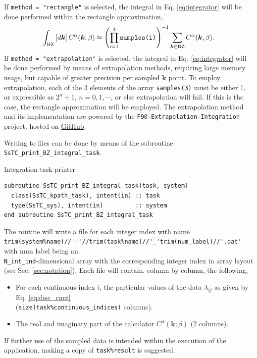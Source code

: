 \documentclass[10pt,a4paper]{article}
\begin{document}
If \verb|method = "rectangle"| is selected, the integral in Eq. \eqref{eq:integrator} will be done performed within the rectangle approximation,
\begin{equation}
\int_{\text{BZ}} \left[d\bm{k}\right]C^{\alpha}(\bm{k},\beta) \approx \left(\prod_{i=1}^3 \verb|samples(i)|\right)^{-1}\sum_{\bm{k}\in\text{BZ}} C^{\alpha}(\bm{k},\beta).
\end{equation}
If \verb|method = "extrapolation"| is selected, the integral in Eq. \eqref{eq:integrator} will be done performed by means of extrapolation methods, requiring large memory usage, but capable of greater precision per sampled $\bm{k}$ point. To employ extrapolation, each of the 3 elements of the array \verb|samples(3)| must be either 1, or expressible as $2^n + 1$, $n = 0, 1, \cdots$, or else extrapolation will fail. If this is the case, the rectangle approximation will be employed. The extrapolation method and its implementation are powered by the \verb|F90-Extrapolation-Integration| project, hosted on \href{https://github.com/irukoa/F90-Extrapolation-Integration}{GitHub}.

Writing to files can be done by means of the subroutine \verb|SsTC_print_BZ_integral_task|.
\begin{codebox}{Integration task printer}
\begin{lstlisting}[caption={Interface of the ``integrator" printer.},captionpos=b]
subroutine SsTC_print_BZ_integral_task(task, system)
  class(SsTC_kpath_task), intent(in) :: task
  type(SsTC_sys), intent(in)         :: system
end subroutine SsTC_print_BZ_integral_task
\end{lstlisting}
\end{codebox}
The routine will write a file for each integer index with name \\ \verb|trim(system%name)//'-'//trim(task%name)//'_'trim(num_label)//'.dat'| with num label being an \\ \verb|N_int_ind|-dimensional array with the corresponding integer index in array layout (see Sec. \ref{sec:notation}). Each file will contain, column by column, the following,
\begin{tcolorbox}
\begin{itemize}
\item For each continuous index $i$, the particular values of the data $\lambda_{ij}$ as given by Eq. \eqref{eq:disc_cont} \\ (\verb|size(task%continuous_indices)| columns).
\item The real and imaginary part of the calculator $C^{\alpha}(\bm{k};\beta)$ (2 columns).
\end{itemize}
\end{tcolorbox}
If further use of the sampled data is intended within the execution of the application, making a copy of \verb|task%result| is suggested.
\end{document}
